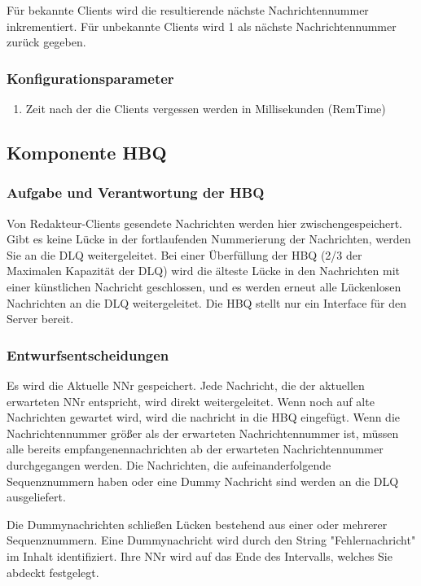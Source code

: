 \documentclass{article}
\begin{document}
Für bekannte Clients wird die resultierende nächste Nachrichtennummer inkrementiert. Für unbekannte Clients wird 1 als nächste Nachrichtennummer zurück gegeben.

\subsubsection{Konfigurationsparameter}
\begin{enumerate}
    \item{Zeit nach der die Clients vergessen werden in Millisekunden (RemTime)}
\end{enumerate}

\newpage
			
\subsection{Komponente HBQ}
\subsubsection{Aufgabe und Verantwortung der HBQ}
Von Redakteur-Clients gesendete Nachrichten werden hier zwischengespeichert. Gibt es keine Lücke in der fortlaufenden Nummerierung der Nachrichten, werden Sie an die DLQ weitergeleitet. Bei einer Überfüllung der HBQ (2/3 der Maximalen Kapazität der DLQ) wird die älteste Lücke in den Nachrichten mit einer künstlichen Nachricht geschlossen, und es werden erneut alle Lückenlosen Nachrichten an die DLQ weitergeleitet. Die HBQ stellt nur ein Interface für den Server bereit.

\subsubsection{Entwurfsentscheidungen}
Es wird die Aktuelle NNr gespeichert.
Jede Nachricht, die der aktuellen erwarteten NNr entspricht, wird direkt weitergeleitet.
Wenn noch auf alte Nachrichten gewartet wird, wird die nachricht in die HBQ eingefügt.
Wenn die Nachrichtennummer größer als der erwarteten Nachrichtennummer ist,
müssen alle bereits empfangenennachrichten ab der erwarteten Nachrichtennummer durchgegangen werden.
Die Nachrichten, die aufeinanderfolgende Sequenznummern haben oder eine Dummy Nachricht sind werden an die
DLQ ausgeliefert. 

Die Dummynachrichten schließen Lücken bestehend aus einer oder mehrerer Sequenznummern.
Eine Dummynachricht wird durch den String "Fehlernachricht" im Inhalt identifiziert.
Ihre NNr wird auf das Ende des Intervalls, welches Sie abdeckt festgelegt.
\end{document}

